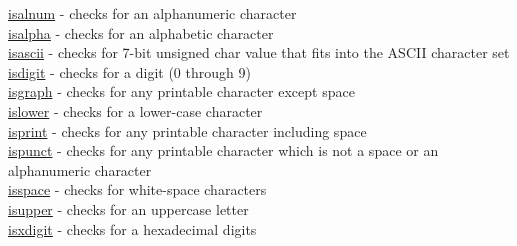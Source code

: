 \hyperlink{isalnum}{isalnum} - checks for an alphanumeric character\\
\hyperlink{isalpha}{isalpha} - checks for an alphabetic character\\
\hyperlink{isascii}{isascii} - checks for 7-bit unsigned char value that fits into the ASCII character set\\
\hyperlink{isdigit}{isdigit} - checks for a digit (0 through 9)\\
\hyperlink{isgraph}{isgraph} - checks for any printable character except space\\
\hyperlink{islower}{islower} - checks for a lower-case character\\
\hyperlink{isprint}{isprint} - checks for any printable character including space\\
\hyperlink{ispunct}{ispunct} - checks for any printable character which is not a space or an alphanumeric character\\
\hyperlink{isspace}{isspace} - checks for white-space characters\\
\hyperlink{isupper}{isupper} - checks for an uppercase letter\\
\hyperlink{isxdigit}{isxdigit} - checks for a hexadecimal digits\\




















